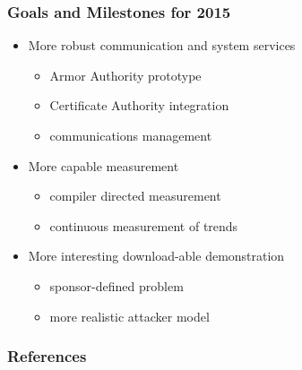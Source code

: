 \documentclass{beamer}
\begin{document}
\begin{frame}
  \frametitle{Goals and Milestones for 2015}

  \begin{itemize}
  \item More robust communication and system services
    \begin{itemize}
    \item Armor Authority prototype
    \item Certificate Authority integration
    \item communications management
    \end{itemize}
  \item More capable measurement
    \begin{itemize}
    \item compiler directed measurement
    \item continuous measurement of trends
    \end{itemize}
  \item More interesting download-able demonstration
    \begin{itemize}
    \item sponsor-defined problem
    \item more realistic attacker model
    \end{itemize}
  \end{itemize}
\end{frame}




\nocite{Coker::Principles-of-R,Haldar:04:Semantic-Remote,Fabrega:1999aa,Ryan:09:Introduction-to}

\begin{frame}
  \frametitle{References}
  
\end{frame}
\end{document}
